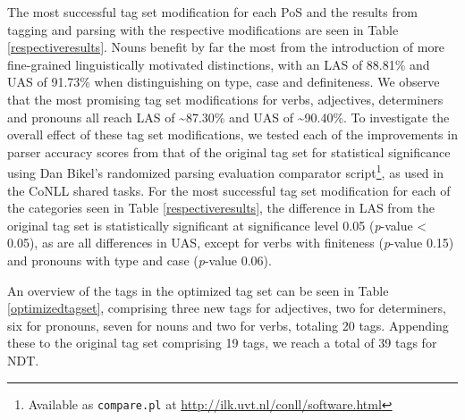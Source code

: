 \documentclass[11pt,a4paper]{article}
\begin{document}
The most successful tag set modification for each PoS and the results from
tagging and parsing with the respective modifications are seen in Table
\ref{respectiveresults}. Nouns benefit by far the most from the introduction of
more fine-grained linguistically motivated distinctions, with an LAS of 88.81\%
and UAS of 91.73\% when distinguishing on type, case and definiteness. We
observe that the most promising tag set modifications for verbs, adjectives,
determiners and pronouns all reach LAS of \textasciitilde 87.30\% and UAS of
\textasciitilde 90.40\%. To investigate the overall effect of these tag set
modifications, we tested each of the improvements in parser accuracy scores
from that of the original tag set for statistical significance using Dan
Bikel's randomized parsing evaluation comparator script\footnote{Available as
    \texttt{compare.pl} at \url{http://ilk.uvt.nl/conll/software.html}}, as
used in the CoNLL shared tasks. For the most successful tag set modification
for each of the categories seen in Table \ref{respectiveresults}, the
difference in LAS from the original tag set is statistically significant at
significance level 0.05 (\emph{p}-value < 0.05), as are all differences in UAS,
except for verbs with finiteness (\emph{p}-value 0.15) and pronouns with type
and case (\emph{p}-value 0.06).

An overview of the tags in the optimized tag set can be seen in Table
\ref{optimizedtagset}, comprising three new tags for adjectives, two for
determiners, six for pronouns, seven for nouns and two for verbs, totaling 20
tags. Appending these to the original tag set comprising 19 tags, we reach a
total of 39 tags for NDT.
\end{document}
